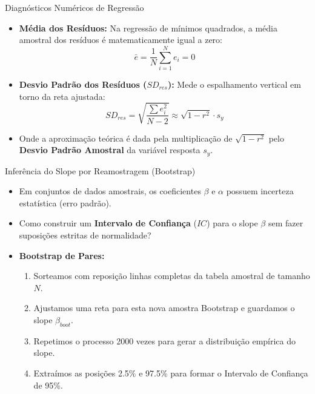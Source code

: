 \begin{frame}{Diagnósticos Numéricos de Regressão}
    \begin{itemize}
        \item \textbf{Média dos Resíduos:} Na regressão de mínimos quadrados, a média amostral dos resíduos é matematicamente igual a zero:
        $$\bar{e} = \frac{1}{N} \sum_{i=1}^N e_i = 0$$
        \item \textbf{Desvio Padrão dos Resíduos ($SD_{res}$):} Mede o espalhamento vertical em torno da reta ajustada:
        $$SD_{res} = \sqrt{\frac{\sum e_i^2}{N - 2}} \approx \sqrt{1 - r^2} \cdot s_y$$
        \item Onde a aproximação teórica é dada pela multiplicação de $\sqrt{1 - r^2}$ pelo \textbf{Desvio Padrão Amostral} da variável resposta $s_y$.
    \end{itemize}
\end{frame}

\begin{frame}{Inferência do Slope por Reamostragem (Bootstrap)}
    \begin{itemize}
        \item Em conjuntos de dados amostrais, os coeficientes $\beta$ e $\alpha$ possuem incerteza estatística (erro padrão).
        \item Como construir um \textbf{Intervalo de Confiança} ($IC$) para o slope $\beta$ sem fazer suposições estritas de normalidade?
        \item \textbf{Bootstrap de Pares:}
        \begin{enumerate}
            \item Sorteamos com reposição linhas completas da tabela amostral de tamanho $N$.
            \item Ajustamos uma reta para esta nova amostra Bootstrap e guardamos o slope $\beta_{boot}$.
            \item Repetimos o processo 2000 vezes para gerar a distribuição empírica do slope.
            \item Extraímos as posições 2.5\% e 97.5\% para formar o Intervalo de Confiança de 95\%.
        \end{enumerate}
    \end{itemize}
\end{frame}

